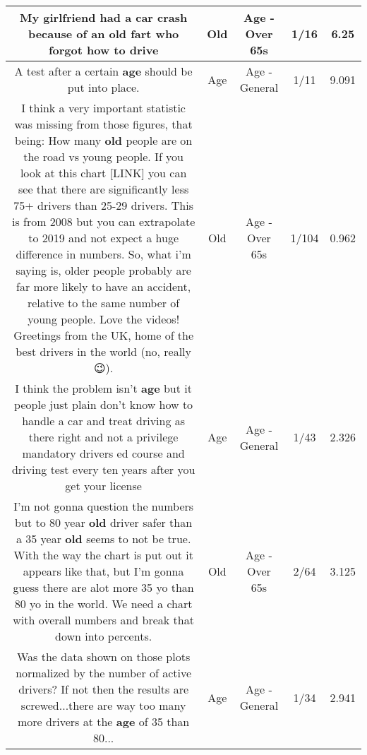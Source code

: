\documentclass[11pt]{article}
\newlength\mylength
\begin{document}
\begin{center}
\begin{longtable}{|C{.65\mylength}|C{.30\mylength}|C{.12\mylength}|C{.12\mylength}|C{.12\mylength}|}
  \small My girlfriend had a car crash because of an \textbf{old} fart who forgot how to drive\normalsize   & Old & Age - Over 65s & 1/16 & 6.25 \\  \hline
  \small A test after a certain \textbf{age} should be put into place.\normalsize   & Age & Age - General & 1/11 & 9.091 \\  \hline
  \small I think a very important statistic was missing from those figures, that being: How many \textbf{old} people are on the road vs young people. If you look at this chart  [LINK]  you can see that there are significantly less 75+ drivers than 25-29 drivers. This is from 2008 but you can extrapolate to 2019 and not expect a huge difference in numbers. So, what i'm saying is, older people probably are far more likely to have an accident, relative to the same number of young people. Love the videos! Greetings from the UK, home of the best drivers in the world (no, really 😉).\normalsize   & Old & Age - Over 65s & 1/104 & 0.962 \\  \hline
  \small I think the problem isn't \textbf{age} but it people just plain don't know how to handle a car and treat driving as there right and not a privilege mandatory drivers ed course and driving test every ten years after you get your license\normalsize   & Age & Age - General & 1/43 & 2.326 \\  \hline
  \small I'm not gonna question the numbers but to 80 year \textbf{old} driver safer than a 35 year \textbf{old} seems to not be true. With the way the chart is put out it appears like that, but I'm gonna guess there are alot more 35 yo than 80 yo in the world. We need a chart with overall numbers and break that down into percents.\normalsize   & Old & Age - Over 65s & 2/64 & 3.125 \\  \hline
  \small Was the data shown on those plots normalized by the number of active drivers? If not then the results are screwed...there are way too many more drivers at the \textbf{age} of 35 than 80...\normalsize   & Age & Age - General & 1/34 & 2.941 \\  \hline

\end{longtable}
\end{center}
\end{document}
